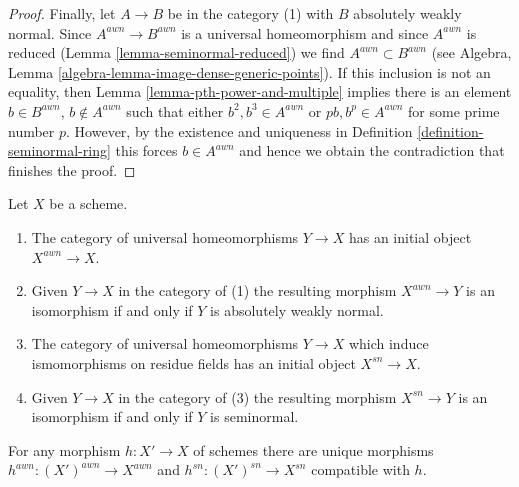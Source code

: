 \begin{proof}
\medskip\noindent
Finally, let $A \to B$ be in the category (1) with $B$ absolutely weakly normal.
Since $A^{awn} \to B^{awn}$ is a universal homeomorphism and 
since $A^{awn}$ is reduced (Lemma \ref{lemma-seminormal-reduced}) we find
$A^{awn} \subset B^{awn}$
(see Algebra, Lemma \ref{algebra-lemma-image-dense-generic-points}).
If this inclusion is not an equality, then
Lemma \ref{lemma-pth-power-and-multiple}
implies there is an element $b \in B^{awn}$, $b \not \in A^{awn}$
such that either $b^2, b^3 \in A^{awn}$ or $pb, b^p \in A^{awn}$
for some prime number $p$. However, by the existence and uniqueness in
Definition \ref{definition-seminormal-ring} this forces $b \in A^{awn}$
and hence we obtain the contradiction that finishes the proof.
\end{proof}

\begin{lemma}
\label{lemma-seminormalization}
Let $X$ be a scheme.
\begin{enumerate}
\item The category of universal homeomorphisms $Y \to X$ has
an initial object $X^{awn} \to X$.
\item Given $Y \to X$ in the category of (1) the resulting morphism
$X^{awn} \to Y$ is an isomorphism if and only if $Y$ is
absolutely weakly normal.
\item The category of universal homeomorphisms $Y \to X$ which
induce ismomorphisms on residue fields has an initial object
$X^{sn} \to X$.
\item Given $Y \to X$ in the category of (3) the resulting morphism
$X^{sn} \to Y$ is an isomorphism if and only if $Y$ is seminormal.
\end{enumerate}
For any morphism $h : X' \to X$ of schemes there are unique morphisms
$h^{awn} : (X')^{awn} \to X^{awn}$ and $h^{sn} : (X')^{sn} \to X^{sn}$
compatible with $h$.
\end{lemma}

